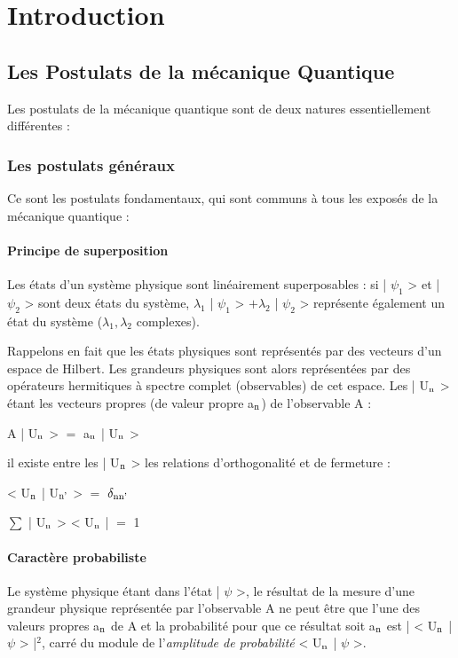 

 \chapter{Introduction}
\section{Les Postulats de la mécanique Quantique}

Les postulats de la mécanique quantique sont de deux
natures essentiellement différentes :
\subsection{Les postulats généraux}
Ce sont les postulats fondamentaux, qui
sont communs à tous les exposés de la mécanique quantique :

\subsubsection{Principe de superposition}
Les états d'un système
physique sont linéairement superposables : si | $\psi_1$ > et | $\psi_2$ > sont
deux états du système, $\lambda_1$ | $\psi_1$ > $+ \lambda_2$ | $\psi_2$ >
représente également un état du système ($\lambda_1, \lambda_2$ complexes).

Rappelons en fait que les états physiques sont représentés
par des vecteurs d'un espace de Hilbert. Les grandeurs physiques sont
alors représentées par des opérateurs hermitiques à spectre complet
(observables) de cet espace. Les | U$_{\text{n}}$ > étant les vecteurs propres
(de valeur propre a$_{\text{n}}$) de l'observable A :
\begin{center}
A | U$_{\text{n}}$ > $=$ a$_{\text{n}}$ | U$_{\text{n}}$ >
\end{center}
il existe entre les | U$_{\text{n}}$ > les relations d'orthogonalité et de
fermeture :
\begin{center}
< U$_{\text{n}}$ | U$_{\text{n'}}$ > $=$ $\delta_{\text{nn'}}$

$\sum$ | U$_{\text{n}}$ > < U$_{\text{n}}$ | $=$ 1
\end{center}

\subsubsection{Caractère probabiliste}
Le système physique étant dans
l'état | $\psi$ >, le résultat de la mesure d'une grandeur physique représentée
par l'observable A ne peut être que l'une des valeurs propres
a$_{\text{n}}$ de A et la probabilité pour que ce résultat soit a$_{\text{n}}$ est
| < U$_{\text{n}}$ | $\psi$ > |$^2$, carré du module de l'{\it amplitude de probabilité}
< U$_{\text{n}}$ | $\psi$ >.
